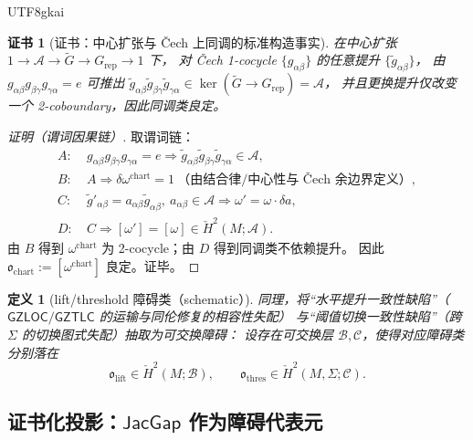 \documentclass[12pt]{article}
\newtheorem{definition}{定义}[section]
\newtheorem{certificate}{证书}[section]
\newcommand{\GZLOC}{\ensuremath{\mathsf{GZLOC}}}
\newcommand{\GZTLC}{\ensuremath{\mathsf{GZTLC}}}
\newcommand{\JacGap}{\ensuremath{\mathsf{JacGap}}}
\begin{document}
\begin{CJK*}{UTF8}{gkai}
\begin{certificate}[证书：中心扩张与 Čech 上同调的标准构造事实]
\label{cert:chart-omega-standard}
在中心扩张 $1\to\mathcal{A}\to\widetilde{G}\to G_{\mathrm{rep}}\to 1$ 下，
对 Čech 1-cocycle $\{g_{\alpha\beta}\}$ 的任意提升 $\{\tilde g_{\alpha\beta}\}$，
由
$g_{\alpha\beta}g_{\beta\gamma}g_{\gamma\alpha}=e$
可推出 $\tilde g_{\alpha\beta}\tilde g_{\beta\gamma}\tilde g_{\gamma\alpha}\in \ker(\widetilde{G}\to G_{\mathrm{rep}})
  =\mathcal{A}$，
并且更换提升仅改变一个 2-coboundary，因此同调类良定。
\end{certificate}

\begin{proof}[证明（谓词因果链）]
取谓词链：
\[
\begin{aligned}
A:&\ g_{\alpha\beta}g_{\beta\gamma}g_{\gamma\alpha}=e
\Rightarrow
\tilde g_{\alpha\beta}\tilde g_{\beta\gamma}\tilde g_{\gamma\alpha}\in \mathcal{A},
\\
B:&\ A\Rightarrow \delta\omega^{\mathrm{chart}}=1\ \text{（由结合律/中心性与 Čech 余边界定义）},
\\
C:&\ \tilde g'_{\alpha\beta}=a_{\alpha\beta}\tilde g_{\alpha\beta},\ a_{\alpha\beta}\in\mathcal{A}
\Rightarrow
\omega'=\omega\cdot \delta a,
\\
D:&\ C\Rightarrow [\omega']=[\omega]\in \check H^2(M;\mathcal{A}).
\end{aligned}
\]
由 $B$ 得到 $\omega^{\mathrm{chart}}$ 为 2-cocycle；由 $D$ 得到同调类不依赖提升。
因此 $\mathfrak{o}_{\mathrm{chart}}:=[\omega^{\mathrm{chart}}]$ 良定。证毕。
\end{proof}

\begin{definition}[lift/threshold 障碍类（schematic）]
\label{def:lift-thres-obstructions}
同理，将“水平提升一致性缺陷”（$\GZLOC/\GZTLC$ 的运输与同伦修复的相容性失配）
与“阈值切换一致性缺陷”（跨 $\Sigma$ 的切换图式失配）抽取为可交换障碍：
设存在可交换层 $\mathcal{B},\mathcal{C}$，使得对应障碍类分别落在
\[
\mathfrak{o}_{\mathrm{lift}}\in \check{H}^2(M;\mathcal{B}),
\qquad
\mathfrak{o}_{\mathrm{thres}}\in \check{H}^2(M,\Sigma;\mathcal{C}).
\]
\end{definition}

\subsection{证书化投影：$\JacGap$ 作为障碍代表元}


\end{CJK*}
\end{document}
